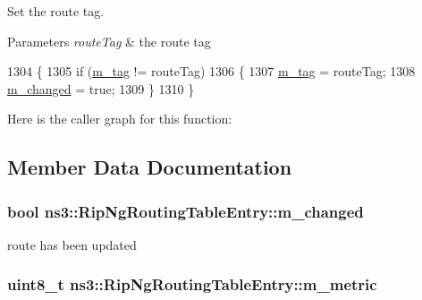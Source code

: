 Set the route tag. 


\begin{DoxyParams}{Parameters}
{\em route\+Tag} & the route tag \\
\hline
\end{DoxyParams}

\begin{DoxyCode}
1304 \{
1305   \textcolor{keywordflow}{if} (\hyperlink{classns3_1_1RipNgRoutingTableEntry_a7847d5c3a75d51734422ae04a7334b4b}{m\_tag} != routeTag)
1306     \{
1307       \hyperlink{classns3_1_1RipNgRoutingTableEntry_a7847d5c3a75d51734422ae04a7334b4b}{m\_tag} = routeTag;
1308       \hyperlink{classns3_1_1RipNgRoutingTableEntry_a6b3773babc90843f6fd88acea68c3430}{m\_changed} = \textcolor{keyword}{true};
1309     \}
1310 \}
\end{DoxyCode}


Here is the caller graph for this function\+:




\subsection{Member Data Documentation}
\subsubsection[{\texorpdfstring{m\+\_\+changed}{m_changed}}]{\setlength{\rightskip}{0pt plus 5cm}bool ns3\+::\+Rip\+Ng\+Routing\+Table\+Entry\+::m\+\_\+changed\hspace{0.3cm}{\ttfamily [private]}}\hypertarget{classns3_1_1RipNgRoutingTableEntry_a6b3773babc90843f6fd88acea68c3430}{}\label{classns3_1_1RipNgRoutingTableEntry_a6b3773babc90843f6fd88acea68c3430}


route has been updated 

\subsubsection[{\texorpdfstring{m\+\_\+metric}{m_metric}}]{\setlength{\rightskip}{0pt plus 5cm}uint8\+\_\+t ns3\+::\+Rip\+Ng\+Routing\+Table\+Entry\+::m\+\_\+metric\hspace{0.3cm}{\ttfamily [private]}}\hypertarget{classns3_1_1RipNgRoutingTableEntry_ab481ccf8df99dc0dcc819a5d07538ee1}{}\label{classns3_1_1RipNgRoutingTableEntry_ab481ccf8df99dc0dcc819a5d07538ee1}



